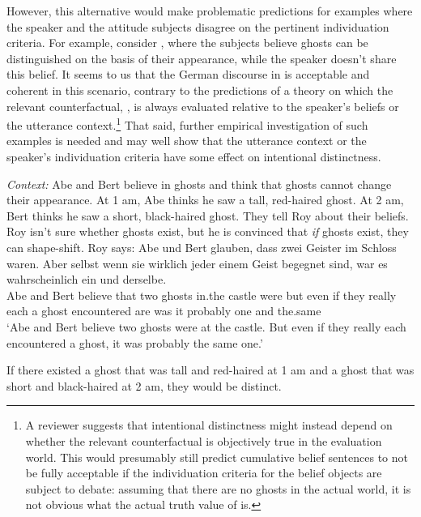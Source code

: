 \documentclass[output=paper]{langscibook}
\begin{document}
\begin{sloppypar}
\noindent However, this alternative would make problematic predictions for examples where the speaker and the attitude subjects disagree on the pertinent individuation criteria. For example, consider , where the subjects believe ghosts can be distinguished on the basis of their appearance, while the speaker doesn't share this belief. It seems to us that the German discourse in  is acceptable and coherent in this scenario, contrary to the predictions of a theory on which the relevant counterfactual, , is always evaluated relative to the speaker's beliefs or the utterance context.\footnote{A reviewer suggests that intentional distinctness might instead depend on whether the relevant counterfactual is objectively true in the evaluation world. This would presumably still predict cumulative belief sentences to not be fully acceptable if the individuation criteria for the belief objects are subject to debate: assuming that there are no ghosts in the actual world, it is not obvious what the actual truth value of  is.} That said, further empirical investigation of such examples is needed and may well show that the utterance context or the speaker's individuation criteria have some effect on intentional distinctness.
\end{sloppypar}

\eanoraggedright 
\eanoraggedright \label{sch-has:ex:rev5a}\textit{Context:} Abe and Bert believe in ghosts and think that ghosts cannot change their appearance. At 1 am, Abe thinks he saw a tall, red-haired ghost. At 2 am, Bert thinks he saw a short, black-haired ghost. They tell Roy about their beliefs. Roy isn't sure whether ghosts exist, but he is convinced that \textit{if} ghosts exist, they can shape-shift. Roy says:
\ex \label{sch-has:ex:rev5}
{\gll Abe und Bert glauben, dass zwei Geister im Schloss waren. Aber selbst wenn sie wirklich jeder einem Geist begegnet sind, war es wahrscheinlich ein und derselbe. \\
Abe and Bert believe that two ghosts in.the castle were but even if they really each a ghost encountered are was it probably one and the.same \\
\glt `Abe and Bert believe two ghosts were at the castle. But even if they really each encountered a ghost, it was probably the same one.'}  \z
 
\ex \label{sch-has:ex:rev5b}If there existed a ghost that was tall and red-haired at 1 am and a ghost that was short and black-haired at 2 am, they would be distinct.
\z %
\end{document}
